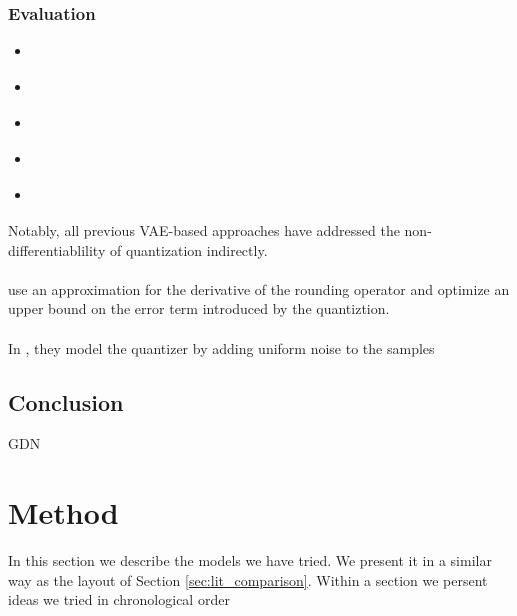 \documentclass{article}
\begin{document}
\subsubsection{Evaluation}
\par
\begin{itemize}
\item \cite{balle2016end} 
\item \cite{toderici2017full}
\item \cite{theis2017lossy}
\item \cite{rippel2017real}
\item \cite{balle2018variational}
\end{itemize}


Notably, all previous VAE-based approaches have addressed the
non-differentiablility of quantization indirectly.
\paragraph{}
\cite{theis2017lossy} use an approximation for the derivative of the rounding
operator and optimize an upper bound on the error term introduced by the
quantiztion.
\paragraph{}
In \cite{balle2016end},\cite{balle2018variational} they model the quantizer by
adding uniform noise to the samples 

\subsection{Conclusion}

GDN \cite{balle2015density} \cite{ioffe2015batch}

%
%

\section{Method}
\label{sec:our_method}
\par
In this section we describe the models we have tried. We present it in a similar
way as the layout of Section \ref{sec:lit_comparison}. Within a section we
persent ideas we tried in chronological order
\end{document}

